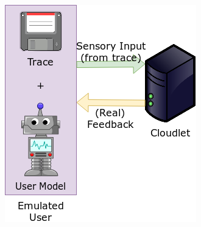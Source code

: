 \documentclass[portrait, a1]{KTHEEposter}
\begin{document}
\begin{pcolumns}[3]
\begin{pcolumn}[2]
\begin{pframe}[1.3]
\begin{center}
                    \includegraphics[width=.75\linewidth]{img/trace_idea_2}
                    \makeatletter
                    \renewcommand{\fnum@figure}{\theoldfigure}
                    \makeatother
                    \setcounter{figure}{0}
                \end{center}
                
            \end{pframe}
        \end{pcolumn}%
        \begin{pcolumn}[2]
            \begin{pframe}[1.52]

\end{pframe}
\end{pcolumn}
\end{pcolumns}
\end{document}
